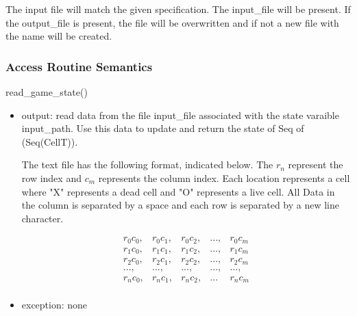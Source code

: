 \documentclass[12pt]{article}
\begin{document}
The input file will match the given specification. The input\_file will be present. If the output\_file is present, the file will be overwritten and if not a new file with the name will be created.

\subsubsection* {Access Routine Semantics}

\noindent read\_game\_state()
\begin{itemize}
\item output: read data from the file input\_file associated with the state varaible input\_path.
  Use this data to update and return the state of Seq of (Seq(CellT)).

  The text file has the following format, indicated below. The $r_n$ represent the row index and $c_m$ represents the column index. Each location represents a cell where "X" represents a dead cell and "O" represents a live cell. All Data in the column is separated by a space and each row is separated by a new line character.
  

  \begin{equation}
    \begin{array}{ccccccc}
      r_0c_0, & r_0c_1, & r_0c_2, & ..., & r_0c_m \\
      r_1c_0, & r_1c_1, & r_1c_2, & ..., & r_1c_m \\
      r_2c_0, & r_2c_1, & r_2c_2, & ..., & r_2c_m \\
       ...,   & ...,    & ...,    & ..., & ...,  \\
      r_nc_0, & r_nc_1, & r_nc_2, & ...  & r_nc_m \\

    \end{array}
  \end{equation}

\item exception: none
\end{itemize}
\end{document}
